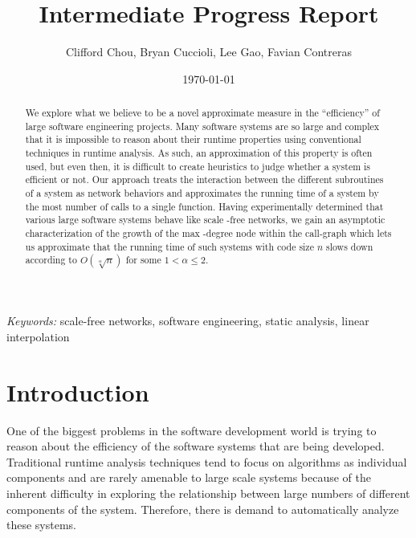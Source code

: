 \documentclass[11pt,a4paper]{article}
\author{Clifford Chou, Bryan Cuccioli, Lee Gao, 
Favian Contreras}
\date{\today}
\title{\textbf{Intermediate Progress Report}} %
\begin{document}


\renewcommand{\abstractname}{Abstract} %
\begin{singlespace}
\maketitle
\begin{abstract}
We explore what we believe to be a novel approximate measure in the 
``efficiency'' of large software engineering projects. Many software systems 
are so large and complex that it is impossible to reason about their
runtime properties using conventional techniques in runtime 
analysis. As such, an approximation of this property is often used, but even 
then, it is difficult to create heuristics to judge whether a system is 
efficient or not. Our approach treats the interaction between the different 
subroutines of a system as network behaviors and approximates the running time 
of a system by the most number of calls to a single function. Having 
experimentally determined that various large software systems behave like scale
-free networks, we gain an asymptotic characterization of the growth of the max
-degree node within the call-graph which lets us approximate that the running 
time of such systems with code size $n$ slows down according to 
$O(\sqrt[\alpha]{n})$ for some $1 < \alpha \le 2$.
\end{abstract}

\hspace*{3,6mm}\textit{Keywords:} {\sf \small  scale-free networks, software 
engineering, static analysis, linear interpolation} %
\end{singlespace}
\vspace{10pt} %


\section*{Introduction}
One of the biggest problems in the software development world is trying to 
reason about the efficiency of the software systems that are being developed. 
Traditional runtime analysis techniques tend to focus on algorithms as 
individual components and are rarely amenable to large scale systems because 
of the inherent difficulty in exploring the relationship between large numbers of 
different components of the system. Therefore, there is demand to 
automatically analyze these systems.
\end{document}
